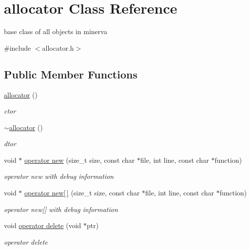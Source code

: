 \hypertarget{classallocator}{}\section{allocator Class Reference}
\label{classallocator}


base class of all objects in minerva  




{\ttfamily \#include $<$allocator.\+h$>$}

\subsection*{Public Member Functions}
\begin{DoxyCompactItemize}
\item 
\mbox{\label{classallocator_a1be74ca7d62eb4accf3bb5d35683f1c0}} 
\hyperlink{classallocator_a1be74ca7d62eb4accf3bb5d35683f1c0}{allocator} ()
\begin{DoxyCompactList}\small\item\em ctor \end{DoxyCompactList}\item 
\mbox{\label{classallocator_a73b8c95bbff9a3b92762988363979442}} 
\hyperlink{classallocator_a73b8c95bbff9a3b92762988363979442}{$\sim$allocator} ()
\begin{DoxyCompactList}\small\item\em dtor \end{DoxyCompactList}\item 
void $\ast$ \hyperlink{classallocator_abf5144276a9c22e8edf9845ee5c03b96}{operator new} (size\+\_\+t size, const char $\ast$file, int line, const char $\ast$function)
\begin{DoxyCompactList}\small\item\em operator new with debug information \end{DoxyCompactList}\item 
void $\ast$ \hyperlink{classallocator_a1ab3345c1d9370e06a3b6deef94b40a7}{operator new\mbox{[}$\,$\mbox{]}} (size\+\_\+t size, const char $\ast$file, int line, const char $\ast$function)
\begin{DoxyCompactList}\small\item\em operator new\mbox{[}\mbox{]} with debug information \end{DoxyCompactList}\item 
void \hyperlink{classallocator_ab4c71bd9e5a544dc78839865978a2cf8}{operator delete} (void $\ast$ptr)
\begin{DoxyCompactList}\small\item\em operator delete \end{DoxyCompactList}\end{DoxyCompactItemize}


